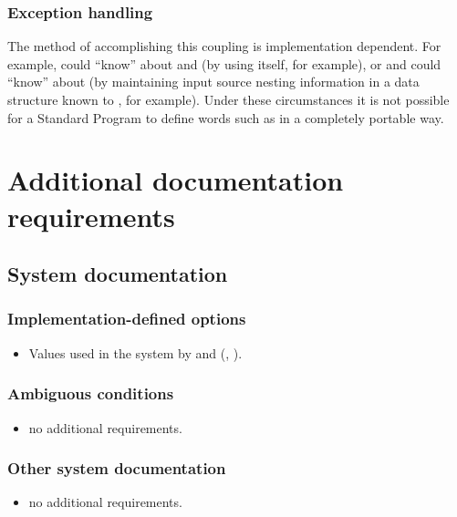 \begin{intro}
\subsubsection{Exception handling}

The method of accomplishing this coupling is implementation dependent.
For example,  could ``know'' about  and
 (by using  itself, for example), or
 and  could ``know'' about 
(by maintaining input source nesting information in a data structure
known to , for example). Under these circumstances it is
not possible for a Standard Program to define words such as
 in a completely portable way.
\end{intro}

\section{Additional documentation requirements} %

\subsection{System documentation} %

\subsubsection{Implementation-defined options} %
\begin{itemize}
\item Values used in the system by  and
	(,
	 ).
\end{itemize}

\subsubsection{Ambiguous conditions} %
\begin{itemize}
\item no additional requirements.
\end{itemize}

\subsubsection{Other system documentation} %
\begin{itemize}
\item no additional requirements.
\end{itemize}

